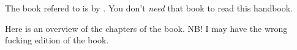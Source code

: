 The book refered to is  by
.
You don't \emph{need} that book to read this handbook.

Here is an overview of the chapters of the book.
NB! I may have the wrong fucking edition of the book.
